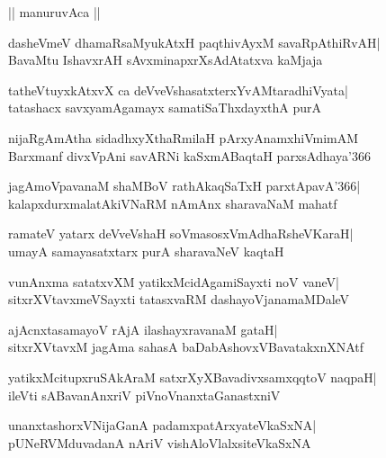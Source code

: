 \documentclass[twoside,12pt,openright]{book}
\newcounter{shloka}[chapter]
\begin{document}
\begin{center}
|| manuruvAca ||
\end{center}
\begin{shloka}%
dasheVmeV dhamaRsaMyukAtxH paqthivAyxM savaRpAthiRvAH|\\
BavaMtu IshavxrAH sAvxminapxrXsAdAtatxva kaMjaja
\end{shloka}

\begin{shloka}%
tatheVtuyxkAtxvX ca deVveVshasatxterxYvAMtaradhiVyata|\\
tatashacx savxyamAgamayx samatiSaThxdayxthA purA
\end{shloka}

\begin{shloka}%
nijaRgAmAtha sidadhxyXthaRmilaH pArxyAnamxhiVmimAM\\
Barxmanf divxVpAni savARNi kaSxmABaqtaH parxsAdhaya\char'366
\end{shloka}

\begin{shloka}%
jagAmoVpavanaM shaMBoV rathAkaqSaTxH parxtApavA\char'366|\\
kalapxdurxmalatAkiVNaRM nAmAnx sharavaNaM mahatf
\end{shloka}

\begin{shloka}%
ramateV yatarx deVveVshaH soVmasosxVmAdhaRsheVKaraH|\\
umayA samayasatxtarx purA sharavaNeV kaqtaH
\end{shloka}

\begin{shloka}%
vunAnxma satatxvXM yatikxMcidAgamiSayxti noV vaneV|\\
sitxrXVtavxmeVSayxti tatasxvaRM dashayoVjanamaMDaleV
\end{shloka}

\begin{shloka}%
ajAcnxtasamayoV rAjA ilashayxravanaM gataH|\\
sitxrXVtavxM jagAma sahasA baDabAshovxVBavatakxnXNAtf
\end{shloka}

\begin{shloka}%
yatikxMcitupxruSAkAraM satxrXyXBavadivxsamxqqtoV naqpaH|\\
ileVti sABavanAnxriV piVnoVnanxtaGanastxniV
\end{shloka}

\begin{shloka}%
unanxtashorxVNijaGanA padamxpatArxyateVkaSxNA|\\
pUNeRVMduvadanA nAriV vishAloVlalxsiteVkaSxNA
\end{shloka}
\end{document}
